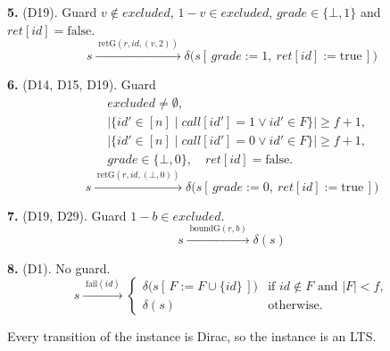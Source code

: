 \noindent\textbf{5.}  (D19).
Guard $v \notin excluded$, $1-v \in excluded$, $grade \in \{\bot, 1\}$ and $ret[id] = \mathrm{false}$.
\[ s \xrightarrow{\;\mathrm{retG}(r,id,(v,2))\;}
   \delta\bigl(s[\,grade := 1,\ ret[id] := \mathrm{true}\,]\bigr) \]

\noindent\textbf{6.}  (D14, D15, D19).
Guard
\[ \begin{aligned}
     &excluded \neq \emptyset,\\
     &\bigl|\{id' \in [n] \mid call[id'] = 1 \vee id' \in F\}\bigr| \ge f + 1,\\
     &\bigl|\{id' \in [n] \mid call[id'] = 0 \vee id' \in F\}\bigr| \ge f + 1,\\
     &grade \in \{\bot, 0\},\quad ret[id] = \mathrm{false}.
   \end{aligned} \]
\[ s \xrightarrow{\;\mathrm{retG}(r,id,(\bot,0))\;}
   \delta\bigl(s[\,grade := 0,\ ret[id] := \mathrm{true}\,]\bigr) \]

\noindent\textbf{7.}  (D19, D29).
Guard $1-b \in excluded$.
\[ s \xrightarrow{\;\mathrm{boundG}(r,b)\;} \delta(s) \]

\noindent\textbf{8.}  (D1).
No guard.
\[ s \xrightarrow{\;\mathrm{fail}(id)\;}
   \begin{cases}
     \delta\bigl(s[\,F := F \cup \{id\}\,]\bigr)
       & \text{if } id \notin F \text{ and } |F| < f,\\
     \delta(s) & \text{otherwise.}
   \end{cases} \]

\medskip
\noindent Every transition of the instance is Dirac, so the instance is an LTS.

